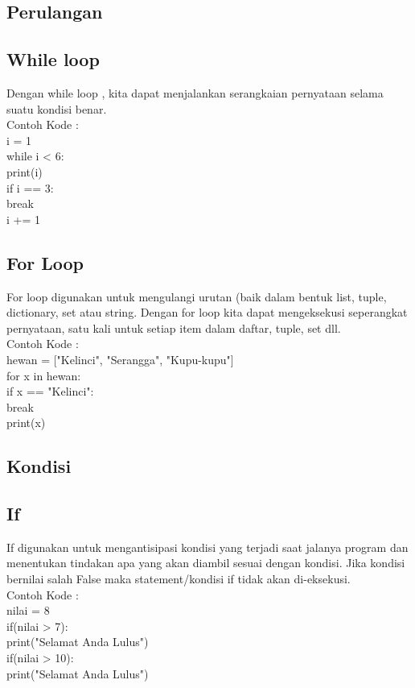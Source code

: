 \subsection{Perulangan}
\subsection{While loop}
Dengan while loop , kita dapat menjalankan serangkaian pernyataan selama suatu kondisi benar.\\
Contoh Kode :\\
i = 1\\
while i < 6:\\
  print(i)\\
  if i == 3:\\
    break\\
  i += 1\\
\subsection{For Loop}
For loop digunakan untuk mengulangi urutan (baik dalam bentuk list, tuple, dictionary, set atau string.
Dengan for loop kita dapat mengeksekusi seperangkat pernyataan, satu kali untuk setiap item dalam daftar, tuple, set dll.\\
Contoh Kode :\\
hewan = ["Kelinci", "Serangga", "Kupu-kupu"]\\
for x in hewan:\\
  if x == "Kelinci":\\
    break\\
  print(x)\\

\subsection{Kondisi}
\subsection{If}
If digunakan untuk mengantisipasi kondisi yang terjadi saat jalanya program dan menentukan tindakan apa yang akan diambil sesuai dengan kondisi. Jika kondisi bernilai salah False maka statement/kondisi if tidak akan di-eksekusi.\\
Contoh Kode :\\
nilai = 8\\
if(nilai > 7):\\
    print("Selamat Anda Lulus")\\
if(nilai > 10):\\
    print("Selamat Anda Lulus")\\

